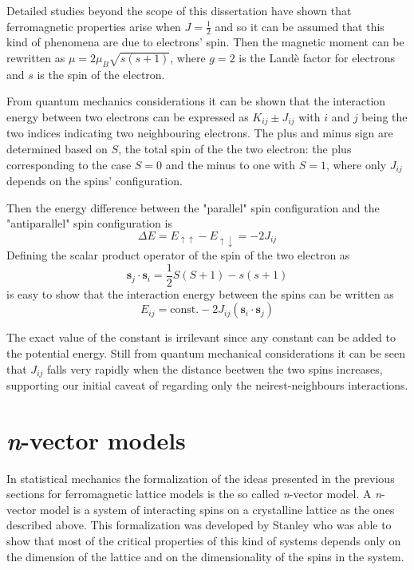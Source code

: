 Detailed studies beyond the scope of this dissertation have shown that ferromagnetic
properties arise when $J=\frac{1}{2}$ and so it can be assumed that this kind of 
phenomena are due to electrons' spin. Then the magnetic moment can be rewritten as 
$\mu = 2 \mu_B \sqrt{s(s+1)}$, where $g=2$ is the Landè factor for electrons and
$s$ is the spin of the electron.

From quantum mechanics considerations \parencite[see][]{bransden2003physics}
it can be shown that the interaction energy between two electrons can be expressed
as $K_{ij} \pm J_{ij}$ with $i$ and $j$ being the two indices indicating two
neighbouring electrons. The plus and minus sign are determined based on $S$, the 
total spin of the the two electron: the plus corresponding to the case $S=0$ and 
the minus to one with $S=1$, where only $J_{ij}$ depends on the spins' configuration.

Then the energy difference between the "parallel" spin configuration and the 
"antiparallel" spin configuration is
$$\Delta E = E_{\uparrow\uparrow} - E_{\uparrow\downarrow} = -2J_{ij}$$
Defining the scalar product operator of the spin of the two electron as 
$$ \mathbf{s}_j \cdot \mathbf{s}_i = \frac{1}{2} S(S+1) - s(s+1)$$
is easy to show that the interaction energy between the spins can be written as
$$ E_{ij} = \text{const.} - 2J_{ij} (\mathbf{s}_i \cdot \mathbf{s}_j)$$

The exact value of the constant is irrilevant since any constant can be added to
the potential energy. Still from quantum mechanical considerations it can be seen
that $J_{ij}$ falls very rapidly when the distance beetwen the two spins increases,
supporting our initial caveat of regarding only the neirest-neighbours interactions.


\section{\textit{n}-vector models}

In statistical mechanics the formalization of the ideas presented in the previous
sections for ferromagnetic lattice models is the so called \textit{n}-vector model.
A \textit{n}-vector model is a system of interacting spins on a crystalline lattice 
as the ones described above. This formalization was developed by Stanley
\parencite[see][]{PhysRevLett.20.589} who was able to show that most of the
critical properties of this kind of systems depends only on the dimension of the
lattice and on the dimensionality of the spins in the system.

